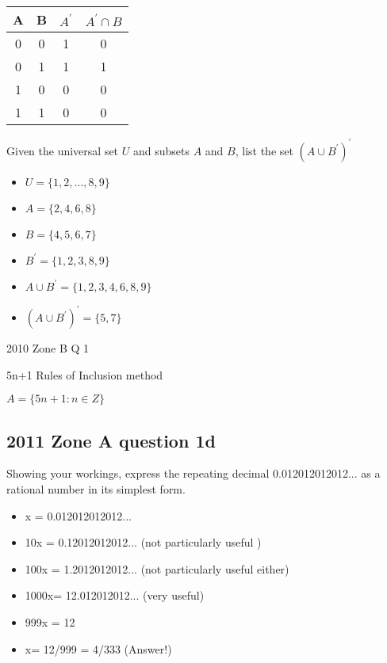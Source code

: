 \begin{tabular}{|c|c|| c | c| }
A&B&$A^{\prime}$&$A^{\prime} \cap B$\\\hline
0&0&1&0\\
0&1&1&1\\
1&0&0&0\\
1&1&0&0\\
\end{tabular}



Given the universal set $U$ and subsets $A$ and $B$, list the set $(A \cup B^{\prime})^{\prime}$
\begin{itemize}
\item $U=\{1,2,\ldots,8,9\}$
\item $A=\{2,4,6,8\}$
\item $B=\{ 4,5,6,7\}$
\item $B^{\prime}=\{ 1, 2, 3, 8, 9  \}$
\item $A \cup B^{\prime}=\{ 1, 2, 3,4, 6, 8, 9  \}$
\item $(A \cup B^{\prime})^{\prime}=\{ 5,7 \}$
\end{itemize}



2010 Zone B Q 1

5n+1 Rules of Inclusion method

$A = \{5n+1: n \in Z \}$

\subsection*{2011 Zone A question 1d}

Showing your workings, express the repeating decimal 0.012012012012...
as a rational number in its simplest form.


\begin{itemize}
\item x = 0.012012012012...
\item 10x = 0.12012012012... (not particularly useful )
\item 100x = 1.2012012012... (not particularly useful either)
\item 1000x= 12.012012012... (very useful)
\item 999x = 12
\item x= 12/999 = 4/333 (Answer!)
\end{itemize}


